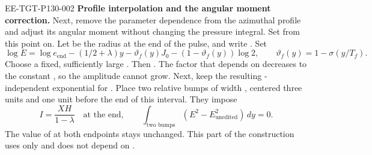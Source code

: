 \begin{EESegment}{EE-TGT-P130-002}
\noindent\textbf{Profile interpolation and the angular moment correction.} Next, remove
the parameter dependence from the azimuthal profile and adjust its angular moment without
changing the pressure integral. Set  from this point on. Let
 be the radius at the end of the pulse, and write
. Set
\begin{equation}
\log E=\log e_{\mathrm{end}}-(1/2+\lambda)y-\vartheta_f(y)J_0
 -(1-\vartheta_f(y))\log2,
\qquad
\vartheta_f(y)=1-\sigma(y/T_f).
\tag{A.10}\label{eq:A.10}
\end{equation}
Choose a fixed, sufficiently large . Then
. The factor that depends on
 decreases to the constant
, so the amplitude cannot grow. Next, keep the resulting
-independent exponential for
. Place two relative
 bumps of width , centered three units
and one unit before the end of this interval. They impose
\begin{equation}
I=\frac{XH}{1-\lambda}\quad\text{at the end},
\qquad
\int_{\text{two bumps}}(E^2-E_{\mathrm{unedited}}^2)\,dy=0.
\tag{A.11}\label{eq:A.11}
\end{equation}
The value of  at both endpoints stays unchanged. This part of
the construction uses only  and does not depend on
.
\end{EESegment}

